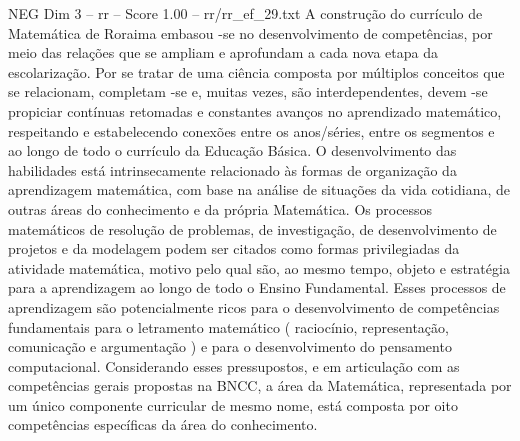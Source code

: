 \begin{textsample}{NEG Dim 3 – rr – Score 1.00 – rr/rr\_ef\_29.txt}
A construção do currículo de Matemática de Roraima embasou -se no desenvolvimento de competências, por meio das relações que se ampliam e aprofundam a cada nova etapa da escolarização.
Por se tratar de uma ciência composta por múltiplos conceitos que se relacionam, completam -se e, muitas vezes, são interdependentes, devem -se propiciar contínuas retomadas e constantes avanços no aprendizado matemático, respeitando e estabelecendo conexões entre os anos/séries, entre os segmentos e ao longo de todo o currículo da Educação Básica.
O desenvolvimento das habilidades está intrinsecamente relacionado às formas de organização da aprendizagem matemática, com base na análise de situações da vida cotidiana, de outras áreas do conhecimento e da própria Matemática.
Os processos matemáticos de resolução de problemas, de investigação, de desenvolvimento de projetos e da modelagem podem ser citados como formas privilegiadas da atividade matemática, motivo pelo qual são, ao mesmo tempo, objeto e estratégia para a aprendizagem ao longo de todo o Ensino Fundamental.
Esses processos de aprendizagem são potencialmente ricos para o desenvolvimento de competências fundamentais para o letramento matemático ( raciocínio, representação, comunicação e argumentação ) e para o desenvolvimento do pensamento computacional.
Considerando esses pressupostos, e em articulação com as competências gerais propostas na BNCC, a área da Matemática, representada por um único componente curricular de mesmo nome, está composta por oito competências específicas da área do conhecimento.

\end{textsample}
